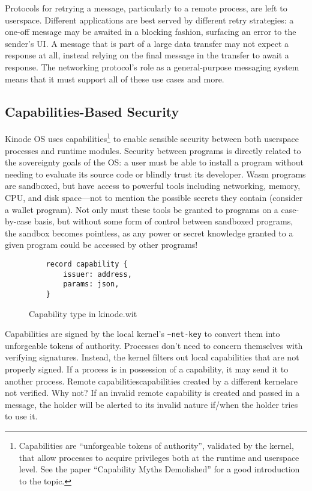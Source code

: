 \documentclass[runningheads]{llncs}
\begin{document}
Protocols for retrying a message, particularly to a remote process, are left to userspace.
Different applications are best served by different retry strategies:
a one-off message may be awaited in a blocking fashion, surfacing an error to the sender's UI.
A message that is part of a large data transfer may not expect a response at all, instead relying on the final message in the transfer to await a response.
The networking protocol's role as a general-purpose messaging system means that it must support all of these use cases and more.

\subsection{Capabilities-Based Security}
\label{sec:oscapabilities}

Kinode OS uses capabilities\footnote{Capabilities are ``unforgeable tokens of authority'', validated by the kernel, that allow processes to acquire privileges both at the runtime and userspace level.
See the paper ``Capability Myths Demolished'' for a good introduction to the topic.}
to enable sensible security between both userspace processes and runtime modules.
Security between programs is directly related to the sovereignty goals of the OS: a user must be able to install a program without needing to evaluate its source code or blindly trust its developer.
Wasm programs are sandboxed, but have access to powerful tools including networking, memory, CPU, and disk space—not to mention the possible secrets they contain (consider a wallet program).
Not only must these tools be granted to programs on a case-by-case basis, but without some form of control between sandboxed programs, the sandbox becomes pointless, as any power or secret knowledge granted to a given program could be accessed by other programs!

\begin{figure}[H]
    \centering
    \begin{verbatim}
    record capability {
        issuer: address,
        params: json,
    }
    \end{verbatim}
    \caption{Capability type in kinode.wit}
    \label{fig:WIT Types 3}
\end{figure}

Capabilities are signed by the local kernel's \verb|~net-key| to convert them into unforgeable tokens of authority.
Processes don't need to concern themselves with verifying signatures.
Instead, the kernel filters out local capabilities that are not properly signed.
If a process is in possession of a capability, it may send it to another process.
Remote capabilities\textemdash capabilities created by a different kernel\textemdash are not verified.
Why not?
If an invalid remote capability is created and passed in a message, the holder will be alerted to its invalid nature if/when the holder tries to use it.
\end{document}
